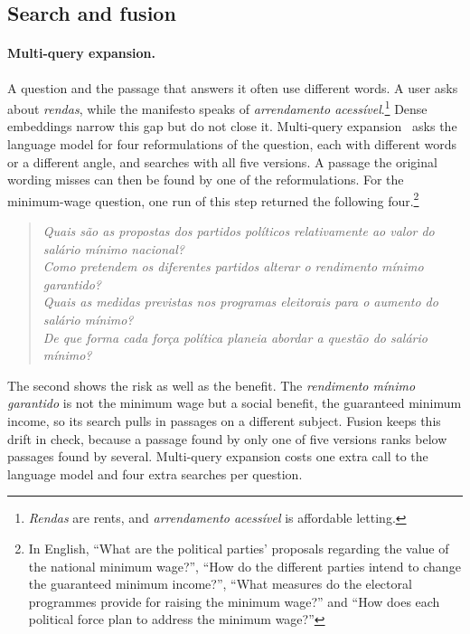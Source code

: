 \subsection{Search and fusion} \label{subsec:search}

\paragraph{Multi-query expansion.} \label{subsec:multiquery}
A question and the passage that answers it often use different words. A user
asks about \textit{rendas}, while the manifesto speaks of
\textit{arrendamento acessível}.\footnote{\textit{Rendas} are rents, and
\textit{arrendamento acessível} is affordable letting.} Dense embeddings narrow
this gap but do not close it. Multi-query expansion~\citep{rag-from-scratch,
rackauckas2024ragfusion} asks the language model for four reformulations of
the question, each with different words or a different angle, and searches
with all five versions. A passage the original wording misses can then be
found by one of the reformulations. For the minimum-wage question, one run of
this step returned the following four.\footnote{In English, ``What are the
political parties' proposals regarding the value of the national minimum
wage?'', ``How do the different parties intend to change the guaranteed
minimum income?'', ``What measures do the electoral programmes provide for
raising the minimum wage?'' and ``How does each political force plan to
address the minimum wage?''}

\begin{quote}
    \small
    \textit{Quais são as propostas dos partidos políticos relativamente ao
    valor do salário mínimo nacional?}\\
    \textit{Como pretendem os diferentes partidos alterar o rendimento mínimo
    garantido?}\\
    \textit{Quais as medidas previstas nos programas eleitorais para o aumento
    do salário mínimo?}\\
    \textit{De que forma cada força política planeia abordar a questão do
    salário mínimo?}
\end{quote}

The second shows the risk as well as the benefit. The \textit{rendimento
mínimo garantido} is not the minimum wage but a social benefit, the guaranteed
minimum income, so its search pulls in passages on a different subject. Fusion
keeps this drift in check, because a passage found by only one of five
versions ranks below passages found by several. Multi-query expansion costs
one extra call to the language model and four extra searches per question.

